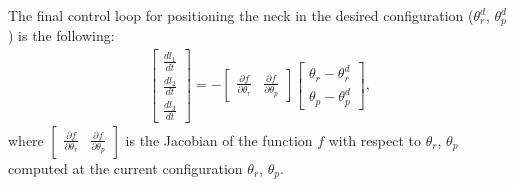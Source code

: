 \documentclass[9pt]{amsart}
\theoremstyle{definition}
\theoremstyle{remark}
\numberwithin{equation}{section}
\begin{document}
The final control loop for positioning the neck in the desired configuration ($\theta_r^d$, $\theta_p^d$) is the following:
\begin{eqnarray} \label{Eq:Control_V1}
\begin{bmatrix}
\frac{d l_1}{dt}\\
\frac{d l_2}{dt}\\
\frac{d l_3}{dt}
\end{bmatrix} = -\begin{bmatrix} \frac{\partial f} {\partial \theta_r} &  \frac{\partial f} {\partial \theta_p} \end{bmatrix}
 \begin{bmatrix}
\theta_r - \theta_r^d\\
\theta_p - \theta_p^d
\end{bmatrix},
\end{eqnarray}
where $\begin{bmatrix} \frac{\partial f} {\partial \theta_r} &  \frac{\partial f} {\partial \theta_p} \end{bmatrix}$ is the Jacobian of the function $f$ with respect to $\theta_r$, $\theta_p$ computed at the current configuration $\theta_r$, $\theta_p$. 
\end{document}
